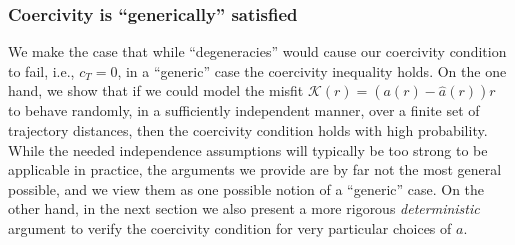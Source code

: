 \subsubsection{Coercivity is ``generically'' satisfied}\label{randomod}
We make the case that while ``degeneracies'' would cause our coercivity condition to fail, i.e., $c_T=0$, in a ``generic'' case the coercivity inequality holds.
On the one hand, we show that if we could model the misfit $\mathcal K(r)=(a(r)- \widehat a(r))r$ to behave randomly, in a sufficiently independent manner, over a finite set of trajectory distances, then
the coercivity condition holds with high probability. While the needed independence assumptions will typically be  too strong to be applicable in practice, the arguments we provide are by far not the most general possible, and we view them as one possible notion of a ``generic'' case.
On the other hand, in the next section we also present a more rigorous {\it deterministic} argument to verify the coercivity condition for very particular choices of $a$.

